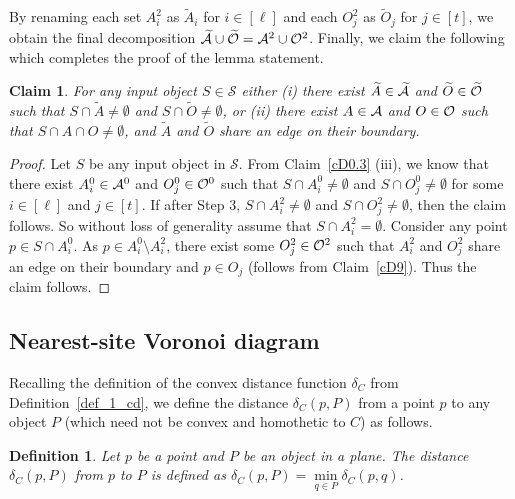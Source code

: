 \documentclass[a4paper,11pt]{article}
\newtheorem{definition}{Definition}
\newtheorem{claim}{Claim}
\begin{document}
 
By renaming each set $A^2_i$ as $\widetilde{A}_i$ for $i \in [\ell]$ and each $O_j^2$ as $\widetilde{O}_j$ for $j \in [t]$, we obtain the final decomposition $\widetilde{\cal A}\cup \widetilde{\cal 
O}= {\cal A}^2\cup {\cal O}^2$. Finally, we claim the following which completes the proof of the lemma statement.

\begin{claim}\label{cD10}
 For any input  object $S\in \mathscr{S}$  
either (i) there exist  $\widetilde{A}\in \widetilde{\cal A}$ and 
$\widetilde{O}\in\widetilde{\cal O}$ such that  $S\cap \widetilde{A}\neq 
\emptyset$ and  $S\cap \widetilde{O}\neq \emptyset$, or (ii) there exist 
 ${A}\in {\cal A}$ and 
${O}\in{\cal O}$ such that  $S\cap {A} \cap {O}\neq \emptyset$, and 
$\widetilde{A}$ and $\widetilde{O}$  share an edge on their boundary.
\end{claim}


\begin{proof}
  Let $S$ be any input object in $\mathscr{S}$. From Claim~\ref{cD0.3} (iii), we know that  there exist 
$A^0_i\in {\cal A}^0$ and $O^0_j\in {\cal O}^0$ such 
that  $S\cap A^0_i\neq 
\emptyset$ and  $S\cap O^0_j\neq \emptyset$ for some $i\in[\ell]$ 
and $j\in [t]$. If after Step 3, $S\cap {A^2_i}\neq 
\emptyset$ and  $S\cap {O^2_j}\neq \emptyset$, then the claim 
follows. So without loss of generality assume that $S\cap {A^2_i}= 
\emptyset$. Consider any point $p\in S\cap A^0_i$. As $p\in  
A^0_i\setminus {A^2_i}$, there exist some ${O^2_j} \in  {\cal O}^2 $ 
such that ${A^2_i}$ and 
${O^2_j} $ share an edge on their boundary and $p\in O_{j}$ 
(follows from Claim~\ref{cD9}). Thus the claim follows.
\end{proof}   


\subsection{Nearest-site Voronoi diagram} \label{nvd}

Recalling the definition of the convex distance function $\delta_{C}$ from Definition~\ref{def_1_cd}, we define the distance $\delta_{C}(p,P)$ from  a point $p$ to any 
 object $P$ (which need not be convex and homothetic to $C$) as follows.

\begin{definition}
 Let $p$ be a point and $P$ be an object in a plane. The distance  
$\delta_{C}(p,P)$ from   $p$ to  
 $P$ is defined as $\delta_{C}(p,P)=\min\limits_{q\in 
P}\delta_C(p,q)$.
\end{definition}
\end{document}
